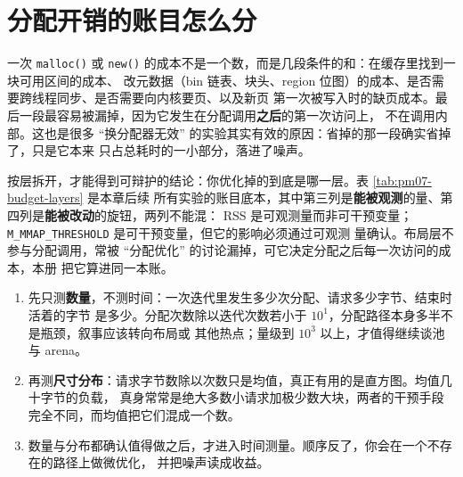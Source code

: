\documentclass[12pt,a4paper,fontset=fandol]{ctexbook}
\newcommand{\Fn}[1]{\texttt{#1()}}
\newcommand{\Tp}[1]{\texttt{#1}}
\newcommand{\Mx}[1]{\textsf{#1}}
\begin{document}
\section{分配开销的账目怎么分}
\label{sec:pm07-budget}

一次 \Fn{malloc} 或 \Fn{new} 的成本不是一个数，而是几段条件的和：在缓存里找到一块可用区间的成本、
改元数据（bin 链表、块头、region 位图）的成本、是否需要跨线程同步、是否需要向内核要页、以及新页
第一次被写入时的缺页成本。最后一段最容易被漏掉，因为它发生在分配调用\textbf{之后}的第一次访问上，
不在调用内部。这也是很多 ``换分配器无效'' 的实验其实有效的原因：省掉的那一段确实省掉了，只是它本来
只占总耗时的一小部分，落进了噪声。

按层拆开，才能得到可辩护的结论：你优化掉的到底是哪一层。表 \ref{tab:pm07-budget-layers} 是本章后续
所有实验的账目底本，其中第三列是\textbf{能被观测}的量、第四列是\textbf{能被改动}的旋钮，两列不能混：
\Mx{RSS} 是可观测量而非可干预变量；\Tp{M\_MMAP\_THRESHOLD} 是可干预变量，但它的影响必须通过可观测
量确认。布局层不参与分配调用，常被 ``分配优化'' 的讨论漏掉，可它决定分配之后每一次访问的成本，本册
把它算进同一本账。

\begin{bestpractice}[title={开工前的一次性判别：这次改动动的是哪一层}]
  \begin{enumerate}
    \item 先只测\textbf{数量}，不测时间：一次迭代里发生多少次分配、请求多少字节、结束时活着的字节
          是多少。分配次数除以迭代次数若小于 $10^1$，分配路径本身多半不是瓶颈，叙事应该转向布局或
          其他热点；量级到 $10^3$ 以上，才值得继续谈池与 arena。
    \item 再测\textbf{尺寸分布}：请求字节数除以次数只是均值，真正有用的是直方图。均值几十字节的负载，
          真身常常是绝大多数小请求加极少数大块，两者的干预手段完全不同，而均值把它们混成一个数。
    \item 数量与分布都确认值得做之后，才进入时间测量。顺序反了，你会在一个不存在的路径上做微优化，
          并把噪声读成收益。
  \end{enumerate}
\end{bestpractice}
\end{document}
